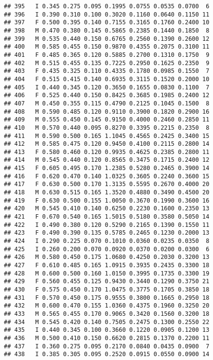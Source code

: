 \documentclass[
]{article}
\begin{document}
\begin{verbatim}
## 395   I 0.345 0.275 0.095 0.1995 0.0755 0.0535 0.0700  6
## 396   I 0.390 0.310 0.100 0.3020 0.1160 0.0640 0.1150 11
## 397   F 0.500 0.395 0.140 0.7155 0.3165 0.1760 0.2400 10
## 398   M 0.470 0.380 0.145 0.5865 0.2385 0.1440 0.1850  8
## 399   M 0.535 0.440 0.150 0.6765 0.2560 0.1390 0.2600 12
## 400   M 0.585 0.455 0.150 0.9870 0.4355 0.2075 0.3100 11
## 401   F 0.485 0.365 0.120 0.5885 0.2700 0.1310 0.1750  9
## 402   M 0.515 0.455 0.135 0.7225 0.2950 0.1625 0.2350  9
## 403   F 0.435 0.325 0.110 0.4335 0.1780 0.0985 0.1550  7
## 404   F 0.515 0.415 0.140 0.6935 0.3115 0.1520 0.2000 10
## 405   I 0.440 0.345 0.120 0.3650 0.1655 0.0830 0.1100  7
## 406   F 0.525 0.440 0.150 0.8425 0.3685 0.1985 0.2400 12
## 407   M 0.450 0.355 0.115 0.4790 0.2125 0.1045 0.1500  8
## 408   M 0.590 0.485 0.120 0.9110 0.3900 0.1820 0.2900 16
## 409   M 0.555 0.450 0.145 0.9150 0.4000 0.2460 0.2850 11
## 410   M 0.570 0.440 0.095 0.8270 0.3395 0.2215 0.2350  8
## 411   M 0.590 0.500 0.165 1.1045 0.4565 0.2425 0.3400 15
## 412   M 0.585 0.475 0.120 0.9450 0.4100 0.2115 0.2800 14
## 413   F 0.580 0.460 0.120 0.9935 0.4625 0.2385 0.2800 11
## 414   M 0.545 0.440 0.120 0.8565 0.3475 0.1715 0.2400 12
## 415   F 0.605 0.495 0.170 1.2385 0.5280 0.2465 0.3900 14
## 416   F 0.620 0.470 0.140 1.0325 0.3605 0.2240 0.3600 15
## 417   F 0.630 0.500 0.170 1.3135 0.5595 0.2670 0.4000 20
## 418   M 0.630 0.515 0.165 1.3520 0.4880 0.3490 0.4500 20
## 419   F 0.630 0.500 0.155 1.0050 0.3670 0.1990 0.3600 16
## 420   M 0.545 0.410 0.140 0.6250 0.2230 0.1600 0.2350 13
## 421   F 0.670 0.540 0.165 1.5015 0.5180 0.3580 0.5050 14
## 422   I 0.490 0.380 0.120 0.5290 0.2165 0.1390 0.1550 11
## 423   F 0.490 0.390 0.135 0.5785 0.2465 0.1230 0.2000 13
## 424   I 0.290 0.225 0.070 0.1010 0.0360 0.0235 0.0350  8
## 425   I 0.260 0.200 0.070 0.0920 0.0370 0.0200 0.0300  6
## 426   M 0.580 0.450 0.175 1.0680 0.4250 0.2030 0.3200 13
## 427   F 0.610 0.485 0.165 1.0915 0.3935 0.2435 0.3300 18
## 428   M 0.600 0.500 0.160 1.0150 0.3995 0.1735 0.3300 19
## 429   F 0.560 0.455 0.125 0.9430 0.3440 0.1290 0.3750 21
## 430   F 0.575 0.450 0.170 1.0475 0.3775 0.1705 0.3850 18
## 431   F 0.570 0.450 0.175 0.9555 0.3800 0.1665 0.2950 18
## 432   M 0.600 0.470 0.155 1.0360 0.4375 0.1960 0.3250 20
## 433   M 0.565 0.455 0.170 0.9065 0.3420 0.1560 0.3200 18
## 434   M 0.545 0.420 0.140 0.7505 0.2475 0.1300 0.2550 22
## 435   I 0.440 0.345 0.100 0.3660 0.1220 0.0905 0.1200 13
## 436   M 0.500 0.410 0.150 0.6620 0.2815 0.1370 0.2200 11
## 437   I 0.360 0.275 0.095 0.2170 0.0840 0.0435 0.0900  7
## 438   I 0.385 0.305 0.095 0.2520 0.0915 0.0550 0.0900 14

\end{verbatim}
\end{document}
